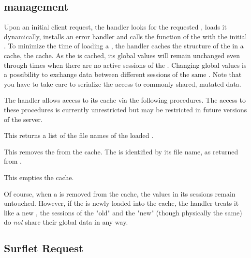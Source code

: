 \subsection{\surflet management}

Upon an initial client request, the \surflet handler looks for the
requested \surflet, loads it dynamically, installs an error handler
and calls the  function of the \surflet with the initial
.   To minimize the time of loading a \surflet,
the \surflet handler caches the structure of the \surflet in a cache,
the \surflet cache.  As the \surflet is cached, its global values will
remain unchanged even through times when there are no active sessions
of the \surflet.  Changing global \surflet values is a possibility to
exchange data between different sessions of the same \surflet.  Note
that you have to take care to serialize the access to commonly shared,
mutated data.

The \surflet handler allows access to its cache via the following
procedures.  The access to these procedures is currently
unrestricted but may be restricted in future versions of the
\surflet server.

\begin{desc}
  This returns a list of the file names of the loaded \surflets. 
\end{desc}

\begin{desc}
  This removes the  from the \surflet cache.  The
   is identified by its file name, as returned from
  .
\end{desc}

\begin{desc}
  This empties the \surflet cache.
\end{desc}

Of course, when a \surflet is removed from the cache, the values in
its sessions remain untouched.  However, if the \surflet is newly
loaded into the \surflet cache, the \surflet handler treats it like a
new \surflet, \ie the sessions of the "old" and the "new" \surflet
(though physically the same) do \emph{not} share their global data in
any way.

\subsection{Surflet Request}

